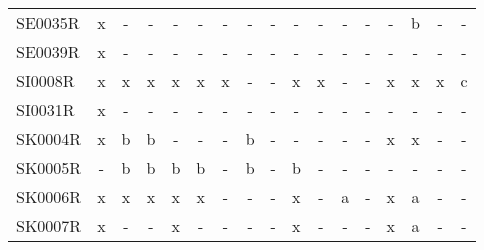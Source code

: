 \begin{table}
{{\begin{tabular}{l|cccccccccccccccc}
        SE0035R &  x &   - &    - &      - &   - &    - &    - &    - &      - &    - &    - &   - &      - &    b &    - &     - \\
        SE0039R &  x &   - &    - &      - &   - &    - &    - &    - &      - &    - &    - &   - &      - &    - &    - &     - \\
        SI0008R &  x &   x &    x &      x &   x &    x &    - &    - &      x &    x &    - &   - &      x &    x &    x &     c \\
        SI0031R &  x &   - &    - &      - &   - &    - &    - &    - &      - &    - &    - &   - &      - &    - &    - &     - \\
        SK0004R &  x &   b &    b &      - &   - &    - &    b &    - &      - &    - &    - &   - &      x &    x &    - &     - \\
        SK0005R &  - &   b &    b &      b &   b &    - &    b &    - &      b &    - &    - &   - &      - &    - &    - &     - \\
        SK0006R &  x &   x &    x &      x &   x &    - &    - &    - &      x &    - &    a &   - &      x &    a &    - &     - \\
        SK0007R &  x &   - &    - &      x &   - &    - &    - &    - &      x &    - &    - &   - &      x &    a &    - &     - \\
\bottomrule
\end{tabular}
 }}
 \end{table}
 

%
%

\cleartoleftpage